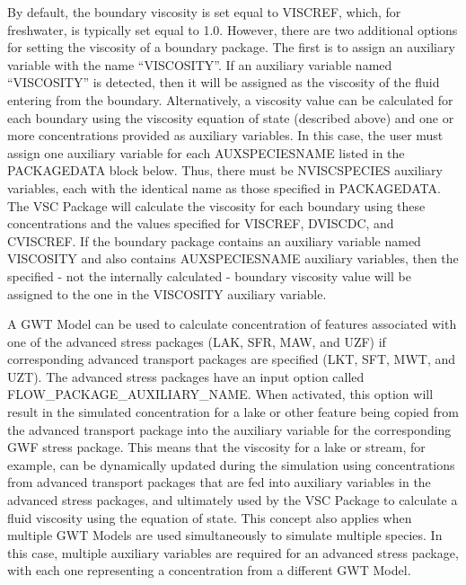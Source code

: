 By default, the boundary viscosity is set equal to VISCREF, which, for freshwater, is typically set equal to 1.0. However, there are two additional options for setting the viscosity of a boundary package.  The first is to assign an auxiliary variable with the name ``VISCOSITY''.  If an auxiliary variable named ``VISCOSITY'' is detected, then it will be assigned as the viscosity of the fluid entering from the boundary.  Alternatively, a viscosity value can be calculated for each boundary using the viscosity equation of state (described above) and one or more concentrations provided as auxiliary variables.  In this case, the user must assign one auxiliary variable for each AUXSPECIESNAME listed in the PACKAGEDATA block below.  Thus, there must be NVISCSPECIES auxiliary variables, each with the identical name as those specified in PACKAGEDATA.  The VSC Package will calculate the viscosity for each boundary using these concentrations and the values specified for VISCREF, DVISCDC, and CVISCREF.  If the boundary package contains an auxiliary variable named VISCOSITY and also contains AUXSPECIESNAME auxiliary variables, then the specified - not the internally calculated - boundary viscosity value will be assigned to the one in the VISCOSITY auxiliary variable.

A GWT Model can be used to calculate concentration of features associated with one of the advanced stress packages (LAK, SFR, MAW, and UZF) if corresponding advanced transport packages are specified (LKT, SFT, MWT, and UZT).  The advanced stress packages have an input option called FLOW\_PACKAGE\_AUXILIARY\_NAME.  When activated, this option will result in the simulated concentration for a lake or other feature being copied from the advanced transport package into the auxiliary variable for the corresponding GWF stress package.  This means that the viscosity for a lake or stream, for example, can be dynamically updated during the simulation using concentrations from advanced transport packages that are fed into auxiliary variables in the advanced stress packages, and ultimately used by the VSC Package to calculate a fluid viscosity using the equation of state.  This concept also applies when multiple GWT Models are used simultaneously to simulate multiple species.  In this case, multiple auxiliary variables are required for an advanced stress package, with each one representing a concentration from a different GWT Model.  


